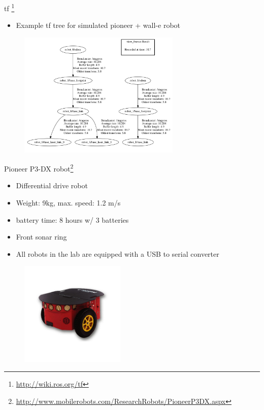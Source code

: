 \documentclass{beamer}
\begin{document}
\begin{frame}{tf \footnote{\url{http://wiki.ros.org/tf}}}
	\begin{itemize}
		\item Example tf tree for simulated pioneer + wall-e robot
	\end{itemize}
	
	\begin{figure}[H]
		\centering
		\includegraphics[height=6.0cm]{images/tf_tree_example.png}
	\end{figure}
	
\end{frame}


\begin{frame}{Pioneer P3-DX robot\footnote{\url{http://www.mobilerobots.com/ResearchRobots/PioneerP3DX.aspx}}}
	\begin{itemize}
		\item Differential drive robot
		\item Weight: 9kg, max. speed: 1.2 m/s
		\item battery time: 8 hours w/ 3 batteries
		\item Front sonar ring
		\item All robots in the lab are equipped with a USB to serial converter
	\end{itemize}
	
	\begin{figure}[H]
		\centering
		\includegraphics[height=5.0cm]{images/pioneer_P3-DX_robot.jpg}
	\end{figure}
	
\end{frame}
\end{document}
